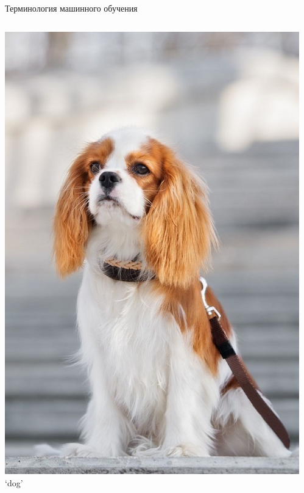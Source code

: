 \documentclass[aspectratio=169, professionalfonts]{beamer}
\begin{document}
\begin{frame}{Терминология машинного обучения}
\begin{columns}
\begin{column}{.1\linewidth}
            \centering
            \includegraphics[width=\linewidth]{graphs/fig17_2.jpg}
            `dog'
        \end{column}
        \begin{column}{.1\linewidth}
            \centering

\end{column}
\end{columns}
\end{frame}
\end{document}
